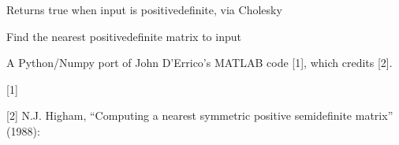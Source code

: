 \documentclass[letterpaper,10pt,english]{sphinxmanual}
\begin{document}
\begin{fulllineitems}

\begin{fulllineitems}
\label{\detokenize{pgamit.classes:pgamit.classes.pyETM.ETM.isPD}}
\pysigstartsignatures
\pysiglinewithargsret
{}
{}
{}
\pysigstopsignatures
\sphinxAtStartPar
Returns true when input is positive\sphinxhyphen{}definite, via Cholesky

\end{fulllineitems}


\begin{fulllineitems}
\label{\detokenize{pgamit.classes:pgamit.classes.pyETM.ETM.load_parameters}}
\pysigstartsignatures
\pysiglinewithargsret
{}
{\sphinxparamcomma {}}
{}
\pysigstopsignatures
\end{fulllineitems}


\begin{fulllineitems}
\label{\detokenize{pgamit.classes:pgamit.classes.pyETM.ETM.nearestPD}}
\pysigstartsignatures
\pysiglinewithargsret
{}
{}
{}
\pysigstopsignatures
\sphinxAtStartPar
Find the nearest positive\sphinxhyphen{}definite matrix to input

\sphinxAtStartPar
A Python/Numpy port of John D’Errico’s  MATLAB code {[}1{]}, which
credits {[}2{]}.

\sphinxAtStartPar
{[}1{]} 

\sphinxAtStartPar
{[}2{]} N.J. Higham, “Computing a nearest symmetric positive semidefinite
matrix” (1988): 

\end{fulllineitems}



\end{fulllineitems}
\end{document}

